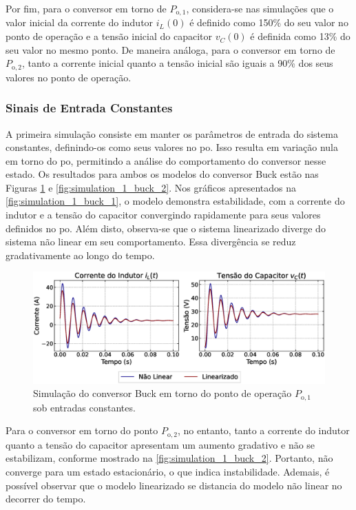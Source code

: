 Por fim, para o conversor em torno de $P_{\mathrm{o}, 1}$, considera-se nas simulações que o valor inicial da corrente do indutor $i_L(0)$ é definido como 150\% do seu valor no ponto de operação e a tensão inicial do capacitor $v_C(0)$ é definida como 13\% do seu valor no mesmo ponto. De maneira análoga, para o conversor em torno de $P_{\mathrm{o}, 2}$, tanto a corrente inicial quanto a tensão inicial são iguais a 90\% dos seus valores no ponto de operação.

\subsubsection{Sinais de Entrada Constantes}

A primeira simulação consiste em manter os parâmetros de entrada do sistema constantes, definindo-os como seus valores no \acrshort{po}. Isso resulta em variação nula em torno do \acrshort{po}, permitindo a análise do comportamento do conversor nesse estado. Os resultados para ambos os modelos do conversor Buck estão nas Figuras \ref{fig:simulation_1_buck_1} e \ref{fig:simulation_1_buck_2}. Nos gráficos apresentados na \autoref{fig:simulation_1_buck_1}, o modelo demonstra estabilidade, com a corrente do indutor e a tensão do capacitor convergindo rapidamente para seus valores definidos no \acrshort{po}. Além disto, observa-se que o sistema linearizado diverge do sistema não linear em seu comportamento. Essa divergência se reduz gradativamente ao longo do tempo.

\begin{figure}[H]
  \centering
  \captionsetup{justification=centering}
  \includegraphics[width=1.\textwidth]{figuras/buck/sim1/op1/result.eps}
  \caption{Simulação do conversor Buck em torno do ponto de operação $P_{\mathrm{o}, 1}$ sob entradas constantes.}
  \label{fig:simulation_1_buck_1}
\end{figure}

Para o conversor em torno do ponto $P_{\mathrm{o}, 2}$, no entanto, tanto a corrente do indutor quanto a tensão do capacitor apresentam um aumento gradativo e não se estabilizam, conforme mostrado na \autoref{fig:simulation_1_buck_2}. Portanto, não converge para um estado estacionário, o que indica instabilidade. Ademais, é possível observar que o modelo linearizado se distancia do modelo não linear no decorrer do tempo.


